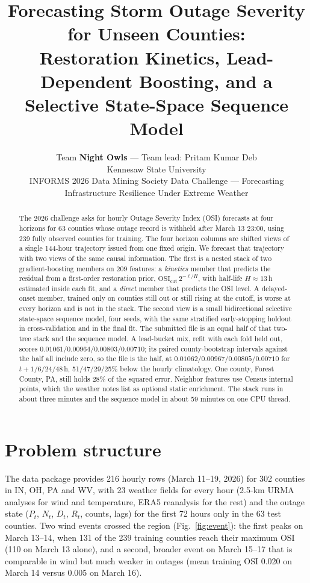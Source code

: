 \documentclass[10pt]{article}
\title{\vspace{-1.6em}\Large Forecasting Storm Outage Severity for Unseen Counties:\\Restoration Kinetics, Lead-Dependent Boosting, and a Selective State-Space Sequence Model\vspace{-0.3em}}
\author{\normalsize Team \textbf{Night Owls} --- Team lead: Pritam Kumar Deb\\
\small Kennesaw State University\\[-2pt]
\small INFORMS 2026 Data Mining Society Data Challenge --- Forecasting Infrastructure Resilience Under Extreme Weather\vspace{-1.2em}}
\date{}
\newcommand{\osi}{\mathrm{OSI}}
\begin{document}
\maketitle

\begin{abstract}\small\noindent
The 2026 challenge asks for hourly Outage Severity Index (OSI) forecasts at four horizons for 63 counties whose outage record is withheld after March 13 23:00, using 239 fully observed counties for training. The four horizon columns are shifted views of a single 144-hour trajectory issued from one fixed origin. We forecast that trajectory with two views of the same causal information. The first is a nested stack of two gradient-boosting members on 209 features: a \emph{kinetics} member that predicts the residual from a first-order restoration prior, $\osi_{\mathrm{cut}}\,2^{-\ell/H}$, with half-life $H\approx13$\,h estimated inside each fit, and a \emph{direct} member that predicts the OSI level. A delayed-onset member, trained only on counties still out or still rising at the cutoff, is worse at every horizon and is not in the stack. The second view is a small bidirectional selective state-space sequence model, four seeds, with the same stratified early-stopping holdout in cross-validation and in the final fit. The submitted file is an equal half of that two-tree stack and the sequence model. A lead-bucket mix, refit with each fold held out, scores $0.01061/0.00964/0.00803/0.00710$; its paired county-bootstrap intervals against the half all include zero, so the file is the half, at $0.01062/0.00967/0.00805/0.00710$ for $t{+}1/6/24/48$\,h, 51/47/29/25\% below the hourly climatology. One county, Forest County, PA, still holds 28\% of the squared error. Neighbor features use Census internal points, which the weather notes list as optional static enrichment. The stack runs in about three minutes and the sequence model in about 59 minutes on one CPU thread.
\end{abstract}

\section{Problem structure}\label{sec:problem}
The data package provides 216 hourly rows (March 11--19, 2026) for 302 counties in IN, OH, PA and WV, with 23 weather fields for every hour (2.5-km URMA analyses \citep{depondeca2011} for wind and temperature, ERA5 reanalysis \citep{hersbach2020} for the rest) and the outage state ($P_t$, $N_t$, $D_t$, $R_t$, counts, lags) for the first 72 hours only in the 63 test counties. Two wind events crossed the region (Fig.~\ref{fig:event}): the first peaks on March 13--14, when 131 of the 239 training counties reach their maximum OSI (110 on March 13 alone), and a second, broader event on March 15--17 that is comparable in wind but much weaker in outages (mean training OSI 0.020 on March 14 versus 0.005 on March 16).
\end{document}
